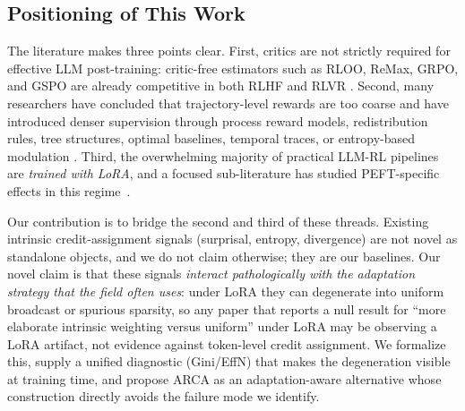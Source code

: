 \subsection{Positioning of This Work}

The literature makes three points clear. First, critics are not strictly required for
effective LLM post-training: critic-free estimators such as RLOO, ReMax, GRPO, and GSPO
are already competitive in both RLHF and RLVR
\cite{ahmadian2024backtobasics,li2023remax,shao2024deepseekmath,zheng2025gspo}. Second,
many researchers have concluded that trajectory-level rewards are too coarse and have
introduced denser supervision through process reward models, redistribution rules, tree
structures, optimal baselines, temporal traces, or entropy-based modulation
\cite{li2024red,cui2025prime,tran2025tempo,cao2025scar,parthasarathi2025grpolambda,li2026otb,hu2026pspo,he2026eapo,yu2026erpo,meng2026sparsebutcritical}.
Third, the overwhelming majority of practical LLM-RL pipelines are \emph{trained with
LoRA}, and a focused sub-literature has studied PEFT-specific effects in this
regime~\cite{hu2021lora,wang2025tina,yin2025peftrlvr,anon2026implicitklra,lee2025tokenefficientrl,minder2025narrowfinetuning,li2025toplora}.

Our contribution is to bridge the second and third of these threads. Existing intrinsic
credit-assignment signals (surprisal, entropy, divergence) are not novel as standalone
objects, and we do not claim otherwise; they are our baselines. Our novel claim is that
these signals \emph{interact pathologically with the adaptation strategy that the field
often uses}: under LoRA they can degenerate into uniform broadcast or spurious sparsity,
so any paper that reports a null result for ``more elaborate intrinsic weighting versus
uniform'' under LoRA may be observing a LoRA artifact, not evidence against token-level credit
assignment. We formalize this, supply a unified diagnostic (Gini/EffN) that makes the
degeneration visible at training
time, and propose ARCA as an adaptation-aware alternative whose construction directly
avoids the failure mode we identify.
